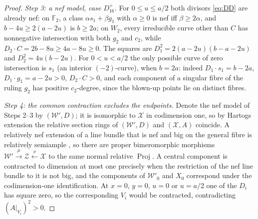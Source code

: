 \documentclass[12pt]{article}
\newcommand{\F}{\mathbb F}
\newcommand{\calX}{\mathcal X}
\newcommand{\calW}{\mathcal W}
\newcommand{\calZ}{\mathcal Z}
\theoremstyle{definition}
\theoremstyle{remark}
\begin{document}
\begin{proof}
\emph{Step 3: a nef model, case \(D_{16}^+\).}
For \(0\leq u\leq a/2\) both divisors \eqref{eq:DD} are already nef:
on \(\F_2\), a class \(\alpha s_1+\beta g_1\) with \(\alpha\geq0\) is
nef iff \(\beta\geq2\alpha\), and \(b-4u\geq2(a-2u)\) is
\(b\geq2a\); on \(W_2\), every irreducible curve other than \(C\) has
nonnegative intersection with both \(g_2\) and \(c_2\), while
\(D_2\cdot C=2b-8u\geq4a-8u\geq0\). The squares are
\(D_1^2=2(a-2u)(b-a-2u)\) and \(D_2^2=4u(b-2u)\).
For \(0<u<a/2\) the only possible curve of zero intersection is
\(s_1\) (an interior \((-2)\)-curve), when \(b=2a\): indeed
\(D_1\cdot s_1=b-2a\), \(D_1\cdot g_1=a-2u>0\), \(D_2\cdot C>0\), and
each component of a singular fibre of the ruling \(g_2\) has positive
\(c_2\)-degree, since the blown-up points lie on distinct fibres.

\emph{Step 4: the common contraction excludes the endpoints.}
Denote the nef model of Steps 2--3 by \((\calW',D)\); it is isomorphic
to \(\calX\) in codimension one, so by Hartogs extension the relative
section rings of \((\calW',D)\) and \((\calX,A)\) coincide. A
relatively nef extension of a line bundle that is nef and big on the
general fibre is relatively semiample \cite[\S2A]{ABE}, so there are
proper bimeromorphic morphisms
\(\calW'\xrightarrow{\,\mu\,}\calZ\xleftarrow{\,\nu\,}\calX\) to the same
normal relative \(\operatorname{Proj}\). A central component is
contracted to dimension at most one precisely when the restriction of
the nef line bundle to it is not big, and the components of
\(\calW'_0\) and \(X_0\) correspond under the codimension-one
identification. At \(x=0\), \(y=0\), \(u=0\) or \(u=a/2\) one of the
\(D_i\) has square zero, so the corresponding \(V_i\) would be
contracted, contradicting \((A|_{V_i})^2>0\).


\end{proof}
\end{document}
